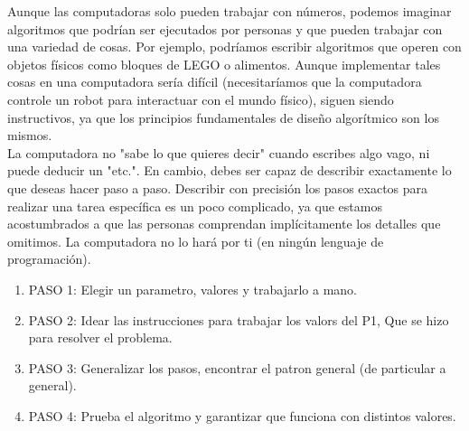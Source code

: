 \documentclass[12pt]{article}
\begin{document}
Aunque las computadoras solo pueden trabajar con números, podemos imaginar algoritmos que podrían ser ejecutados por personas y que pueden trabajar con una variedad de cosas. Por ejemplo, podríamos escribir algoritmos que operen con objetos físicos como bloques de LEGO o alimentos. Aunque implementar tales cosas en una computadora sería difícil (necesitaríamos que la computadora controle un robot para interactuar con el mundo físico), siguen siendo instructivos, ya que los principios fundamentales de diseño algorítmico son los mismos.\\

La computadora no "sabe lo que quieres decir" cuando escribes algo vago, ni puede deducir un "etc.". En cambio, debes ser capaz de describir exactamente lo que deseas hacer paso a paso. Describir con precisión los pasos exactos para realizar una tarea específica es un poco complicado, ya que estamos acostumbrados a que las personas comprendan implícitamente los detalles que omitimos. La computadora no lo hará por ti (en ningún lenguaje de programación).\\

\begin{enumerate}
    \item PASO 1: Elegir un parametro, valores y trabajarlo a mano.
    \item PASO 2: Idear las instrucciones para trabajar los valors del P1, Que se hizo para resolver el problema.
    \item PASO 3: Generalizar los pasos, encontrar el patron general (de particular a general).
    \item PASO 4: Prueba el algoritmo y garantizar que funciona con distintos valores. 
\end{enumerate}
\end{document}
